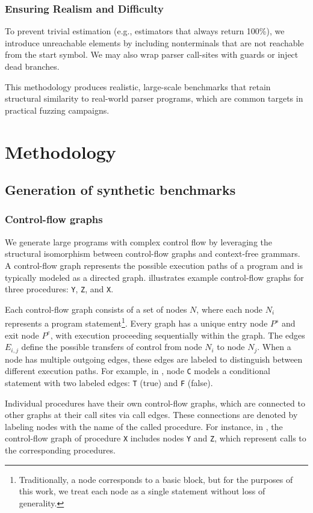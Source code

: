 \documentclass[conference,anonymous,review]{IEEEtran}
\def\<#1>{\texttt{#1}}
\begin{document}
\subsubsection{Ensuring Realism and Difficulty}

To prevent trivial estimation (e.g., estimators that always return 100\%), we introduce unreachable elements by including nonterminals that are not reachable from the start symbol. We may also wrap parser call-sites with guards or inject dead branches.

This methodology produces realistic, large-scale benchmarks that retain structural similarity to real-world parser programs, which are common targets in practical fuzzing campaigns.


\section{Methodology}
\subsection{Generation of synthetic benchmarks}
\subsubsection{Control-flow graphs}
We generate large programs with complex control flow by leveraging the structural isomorphism between control-flow graphs and context-free grammars. A control-flow graph represents the possible execution paths of a program and is typically modeled as a directed graph.  illustrates example control-flow graphs for three procedures: \<Y>, \<Z>, and \<X>.

Each control-flow graph consists of a set of nodes $N$, where each node $N_i$ represents a program statement\footnote{Traditionally, a node corresponds to a basic block, but for the purposes of this work, we treat each node as a single statement without loss of generality.}. Every graph has a unique entry node $P^s$ and exit node $P^e$, with execution proceeding sequentially within the graph. The edges $E_{i,j}$ define the possible transfers of control from node $N_i$ to node $N_j$. When a node has multiple outgoing edges, these edges are labeled to distinguish between different execution paths. For example, in , node \<C> models a conditional statement with two labeled edges: \<T> (true) and \<F> (false).

Individual procedures have their own control-flow graphs, which are connected to other graphs at their call sites via call edges. These connections are denoted by labeling nodes with the name of the called procedure. For instance, in , the control-flow graph of procedure \<X> includes nodes \<Y> and \<Z>, which represent calls to the corresponding procedures.
\end{document}
